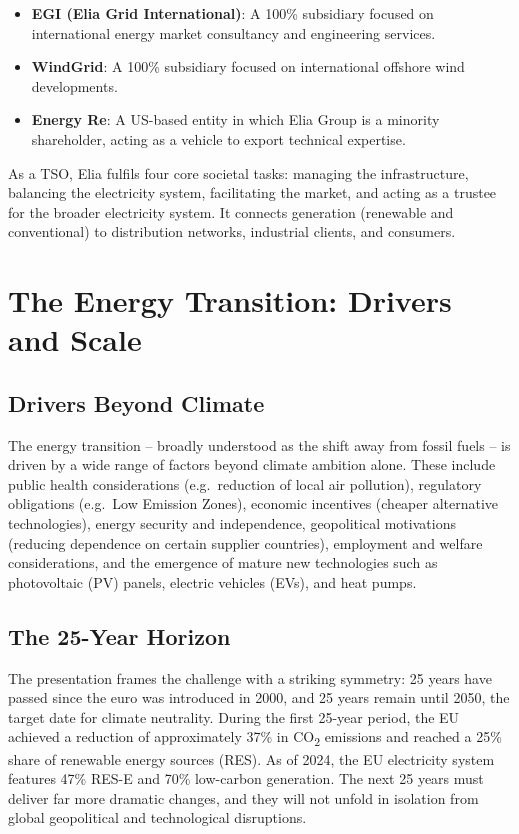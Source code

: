 \begin{itemize}[noitemsep]
    \item \textbf{EGI (Elia Grid International)}: A 100\% subsidiary focused on international energy market consultancy and engineering services.
    \item \textbf{WindGrid}: A 100\% subsidiary focused on international offshore wind developments.
    \item \textbf{Energy Re}: A US-based entity in which Elia Group is a minority shareholder, acting as a vehicle to export technical expertise.
\end{itemize}

As a TSO, Elia fulfils four core societal tasks: managing the infrastructure, balancing the electricity system, facilitating the market, and acting as a trustee for the broader electricity system. It connects generation (renewable and conventional) to distribution networks, industrial clients, and consumers.

\section{The Energy Transition: Drivers and Scale}

\subsection{Drivers Beyond Climate}

The energy transition -- broadly understood as the shift away from fossil fuels -- is driven by a wide range of factors beyond climate ambition alone. These include public health considerations (e.g.\ reduction of local air pollution), regulatory obligations (e.g.\ Low Emission Zones), economic incentives (cheaper alternative technologies), energy security and independence, geopolitical motivations (reducing dependence on certain supplier countries), employment and welfare considerations, and the emergence of mature new technologies such as photovoltaic (PV) panels, electric vehicles (EVs), and heat pumps.

\subsection{The 25-Year Horizon}

The presentation frames the challenge with a striking symmetry: 25 years have passed since the euro was introduced in 2000, and 25 years remain until 2050, the target date for climate neutrality. During the first 25-year period, the EU achieved a reduction of approximately 37\% in CO\textsubscript{2} emissions and reached a 25\% share of renewable energy sources (RES). As of 2024, the EU electricity system features 47\% RES-E and 70\% low-carbon generation. The next 25 years must deliver far more dramatic changes, and they will not unfold in isolation from global geopolitical and technological disruptions.

